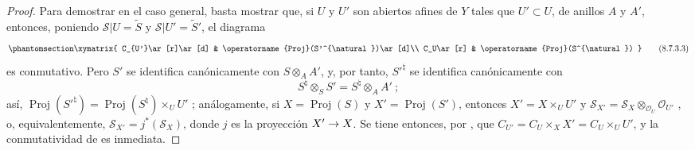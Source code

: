 \documentclass[oneside,10pt]{amsart}
\makeatletter
\newcommand{\ega@arrow}[2]{\mathchoice{#1}{#2}{#2}{#2}}
\renewcommand{\to}{\ega@arrow{\longrightarrow}{\rightarrow}}
\let\EGAOriginalLabel\label
\renewcommand{\label}[1]{\phantomsection\EGAOriginalLabel{#1}}
\makeatother
\begin{document}
\begin{proof}
Para demostrar  en el caso general, basta mostrar que, si $U$ y $U'$ son abiertos afines de $Y$ tales que $U'\subset U$, de anillos $A$ y $A'$, entonces, poniendo $\mathcal{S}|U=\widetilde{S}$ y $\mathcal{S}|U'=\widetilde{S}'$, el diagrama
\begin{equation}
\label{II.8.7.3.3-fr}
  \xymatrix{
    C_{U'}\ar[r]\ar[d] & \operatorname{Proj}(S'^{\natural})\ar[d]\\
    C_U\ar[r] & \operatorname{Proj}(S^{\natural})
  }
\tag{8.7.3.3}
\end{equation}
es conmutativo.
Pero $S'$ se identifica canónicamente con $S\otimes_A A'$, y, por tanto, $S'^{\natural}$ se identifica canónicamente con
\[
  S^{\natural}\otimes_S S'=S^{\natural}\otimes_A A'~;
\]
así, $\operatorname{Proj}(S'^{\natural})=\operatorname{Proj}(S^{\natural})
\times_U U'$ ;
análogamente, si $X=\operatorname{Proj}(S)$ y $X'=\operatorname{Proj}(S')$, entonces $X'=X\times_U U'$ y $\mathcal{S}_{X'}=\mathcal{S}_X\otimes_{\mathcal{O}_U}\mathcal{O}_{U'}$ , o, equivalentemente, $\mathcal{S}_{X'}=j^*(\mathcal{S}_X)$, donde $j$ es la proyección $X'\to X$.
Se tiene entonces, por , que $C_{U'}=C_U\times_X X'=C_U\times_U U'$, y la conmutatividad de  es inmediata.
\end{proof}
\end{document}
